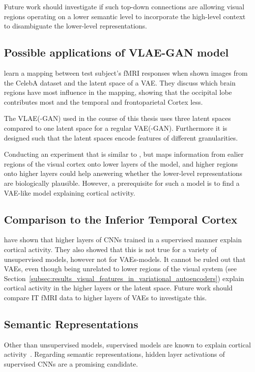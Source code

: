 Future work should investigate if such top-down connections are allowing visual regions operating on a lower semantic level to incorporate the high-level context to disambiguate the lower-level representations.

\subsection{Possible applications of VLAE-GAN model}\label{subsec:possible-applications-of-vlae-gan-model}
\citet{vanrullen2019reconstructing} learn a mapping between test subject's fMRI responses when shown images from the CelebA dataset and the latent space of a \ac{VAE}.
They discuss which brain regions have most influence in the mapping, showing that the occipital lobe contributes most and the temporal and frontoparietal Cortex less.

The \ac{VLAE}(-\ac{GAN}) used in the course of this thesis uses three latent spaces compared to one latent space for a regular \ac{VAE}(-\ac{GAN}).
Furthermore it is designed such that the latent spaces encode features of different granularities.

Conducting an experiment that is similar to \citet{vanrullen2019reconstructing}, but maps information from ealier regions of the visual cortex onto lower layers of the model, and higher regions onto higher layers could help answering whether the lower-level representations are biologically plausible.
However, a prerequisite for such a model is to find a \ac{VAE}-like model explaining cortical activity.

\subsection{Comparison to the Inferior Temporal Cortex}\label{subsec:representational-dissimilarity-matrices}
\citet{khaligh2014deep} have shown that higher layers of \acp{CNN} trained in a supervised manner explain cortical activity.
They also showed that this is not true for a variety of unsupervised models, however not for \acp{VAE}-models.
It cannot be ruled out that \acp{VAE}, even though being unrelated to lower regions of the visual system (see Section~\ref{subsec:results_visual_features_in_variational_autoencoders}) explain cortical activity in the higher layers or the latent space.
Future work should compare \ac{IT} fMRI data to higher layers of \acp{VAE} to investigate this.

\subsection{Semantic Representations}\label{subsec:semantic-representations-results}
Other than unsupervised models, supervised models are known to explain cortical activity~\citep{khaligh2014deep,cadieu2014deep}.
Regarding semantic representations, hidden layer activations of supervised \acp{CNN} are a promising candidate.

